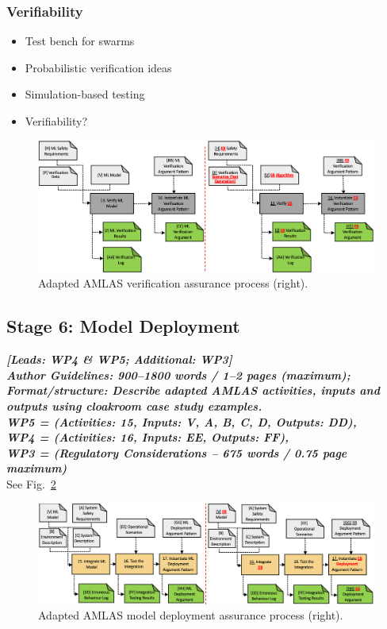 \documentclass[lettersize,journal]{IEEEtran}
\begin{document}
\subsubsection{Verifiability}




\begin{itemize}
	\item Test bench for swarms
	\item Probabilistic verification ideas
	\item Simulation-based testing
	\item Verifiability?
\end{itemize}
\begin{figure}
	\centering
	\includegraphics[width=1.0\textwidth]{figures/amlas-a-stage5.png}
	\caption{Adapted AMLAS verification assurance process (right).}
	\label{amlas-a-stage5}
\end{figure}


\subsection{Stage 6: Model Deployment} \label{framework-stage6}
\noindent \textbf{\textit{[Leads:  WP4 \& WP5; Additional: WP3]}}\\ 
\noindent\textbf{\textit{Author Guidelines: 900–1800 words / 1–2 pages (maximum); \\Format/structure: Describe adapted AMLAS activities, inputs and outputs using cloakroom case study examples.\\ 
\noindent WP5 = (Activities: 15, Inputs: V, A, B, C, D, Outputs: DD), \\
\noindent WP4 = (Activities: 16, Inputs: EE, Outputs: FF), \\
\noindent WP3 = (Regulatory Considerations – 675 words / 0.75 page maximum)}}\\
See Fig.~\ref{amlas-a-stage6}
\begin{figure}
	\centering
	\includegraphics[width=1.0\textwidth]{figures/amlas-a-stage6.png}
	\caption{Adapted AMLAS model deployment assurance process (right).}
	\label{amlas-a-stage6}
\end{figure}
\end{document}
